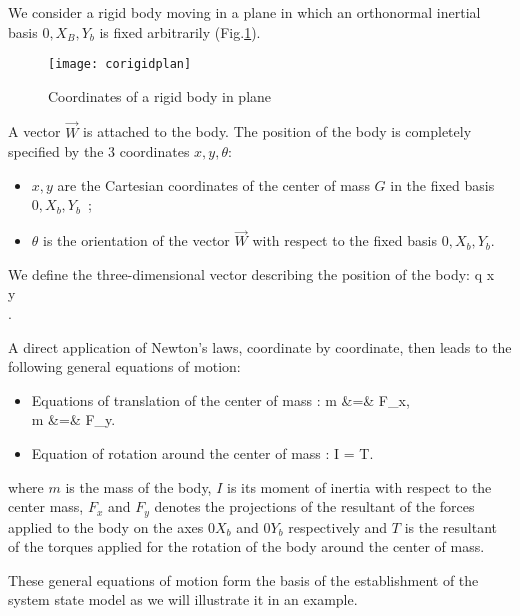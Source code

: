 We consider a rigid body moving in a plane in which an orthonormal inertial basis $ 0,X_B, Y_b$ is fixed arbitrarily (Fig.\ref{Fig:corigidplan}).
\begin{figure}[h]
\begin{center}
\texttt{[image: corigidplan]}
\caption{Coordinates of a rigid body in plane}
\label{Fig:corigidplan}
\end{center}
\end{figure}
A vector $\vec{W}$ is attached to the body. The position of the body is completely specified by the 3 coordinates $x, y, \theta$: 
\begin{itemize}
\item $x, y$ are the Cartesian coordinates of the center of mass $G$ in the fixed basis $0,X_b,Y_b$~;
\item $\theta$ is the orientation of the vector $\vec{W}$ with respect to the fixed basis $0,X_b,Y_b$. 
\end{itemize}
We define the three-dimensional vector describing the position of the body:
\eqn
q \triangleq {} x \\y \\ \theta \ema. \label{cogen}
\eeqn

\noindent A direct application of Newton's laws, coordinate by coordinate, then leads to the following general equations of motion:
\begin{itemize}
\item Equations of translation of the center of mass :
\eqnn
m &=& F_x, \\ m &=& F_y.
\eeqnn
\item Equation of rotation around the center of mass :
\eqnn
I\ddot{\theta} = T.
\eeqnn
\end{itemize}

\noindent where $m$ is the mass of the body, $I$ is its moment of inertia with respect to the center
mass,
$F_x$ and
$F_y$ denotes the projections of the resultant of the forces applied to the body on the
axes $0X_b$ and $0Y_b$ 
respectively and $T$ is the resultant of the torques applied
for the rotation of the body around the center of mass.

These general equations of motion form the basis of the establishment
of the system state model as we will illustrate it in an example.

